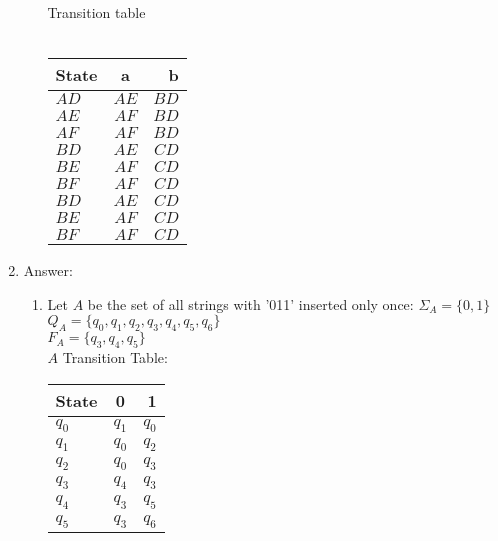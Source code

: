 \documentclass{article}
\begin{document}
\begin{enumerate}
\begin{enumerate}
          Transition table\\\\
          \begin{tabular}{ l | c | r }
            State & a & b \\ \hline
            $AD$ & $AE$ & $BD$ \\
            $AE$ & $AF$ & $BD$ \\
            $AF$ & $AF$ & $BD$ \\

            $BD$ & $AE$ & $CD$ \\
            $BE$ & $AF$ & $CD$ \\
            $BF$ & $AF$ & $CD$ \\

            $BD$ & $AE$ & $CD$ \\
            $BE$ & $AF$ & $CD$ \\
            $BF$ & $AF$ & $CD$ \\
          \end{tabular}
      \end{enumerate}
    \item Answer: 
      \begin{enumerate}
        \item Let $A$ be the set of all strings with '011' inserted only once:
          $\Sigma_A = \{0,1\}$\\
          $Q_A = \{q_0, q_1, q_2, q_3, q_4, q_5, q_6\}$\\
          $F_A = \{q_3, q_4, q_5\}$\\
          $A$ Transition Table:\\
          \begin{tabular}{ l | c | r }
            State & 0 & 1 \\ \hline
            $q_0$ & $q_1$ & $q_0$ \\

            $q_1$ & $q_0$ & $q_2$ \\

            $q_2$ & $q_0$ & $q_3$ \\

            $q_3$ & $q_4$ & $q_3$ \\

            $q_4$ & $q_3$ & $q_5$ \\

            $q_5$ & $q_3$ & $q_6$ \\


\end{tabular}
\end{enumerate}
\end{enumerate}
\end{document}

